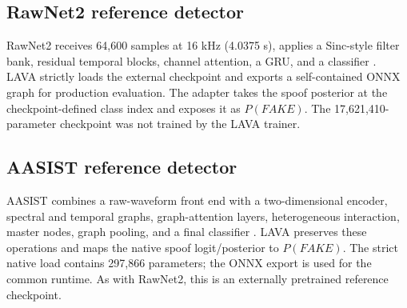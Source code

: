 \documentclass[10pt,journal]{IEEEtran}
\begin{document}
\subsection{RawNet2 reference detector}
RawNet2 receives 64,600 samples at 16 kHz (4.0375 s), applies a Sinc-style filter bank, residual temporal blocks, channel attention, a GRU, and a classifier \cite{tak2021rawnet2,ravanelli2018sincnet}. LAVA strictly loads the external checkpoint and exports a self-contained ONNX graph for production evaluation. The adapter takes the spoof posterior at the checkpoint-defined class index and exposes it as $P(FAKE)$. The 17,621,410-parameter checkpoint was not trained by the LAVA trainer.

\subsection{AASIST reference detector}
AASIST combines a raw-waveform front end with a two-dimensional encoder, spectral and temporal graphs, graph-attention layers, heterogeneous interaction, master nodes, graph pooling, and a final classifier \cite{jung2022aasist,velickovic2018gat}. LAVA preserves these operations and maps the native spoof logit/posterior to $P(FAKE)$. The strict native load contains 297,866 parameters; the ONNX export is used for the common runtime. As with RawNet2, this is an externally pretrained reference checkpoint.
\end{document}
